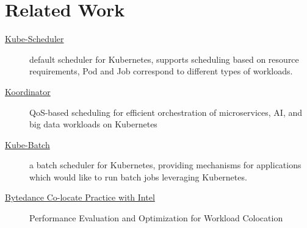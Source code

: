 \section{Related Work}
\begin{description}
	\item [\href{https://kubernetes.io/docs/concepts/scheduling-eviction/kube-scheduler/}{Kube-Scheduler}] default scheduler for Kubernetes, supports scheduling based on resource requirements, Pod and Job correspond to different types of workloads.
	\item [\href{https://koordinator.sh}{Koordinator}] QoS-based scheduling for efficient orchestration of microservices, AI, and big data workloads on Kubernetes\cite{koo}
	\item [\href{https://github.com/kubernetes-retired/kube-batch}{Kube-Batch}] a batch scheduler for Kubernetes, providing mechanisms for applications which would like to run batch jobs leveraging Kubernetes. \cite{:kube-batch}
	\item [\href{https://www.intel.com.br/content/dam/www/public/us/en/documents/white-papers/Intel_ByteDance_WhitePaper.pdf}{Bytedance Co-locate Practice with Intel}] Performance Evaluation and Optimization for Workload Colocation\cite{:aa}
\end{description}

